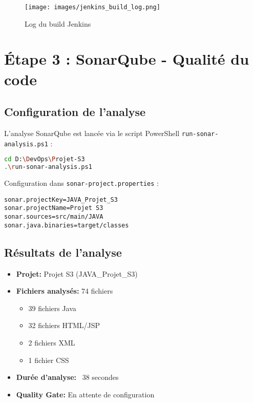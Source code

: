 \documentclass[12pt,a4paper]{article}
\begin{document}
\begin{figure}[H]
    \centering
    \texttt{[image: images/jenkins\_build\_log.png]}
    \caption{Log du build Jenkins}
    \label{fig:jenkins_log}
\end{figure}

\newpage

\section{Étape 3 : SonarQube - Qualité du code}

\subsection{Configuration de l'analyse}

L'analyse SonarQube est lancée via le script PowerShell \texttt{run-sonar-analysis.ps1} :

\begin{lstlisting}[language=bash]
cd D:\DevOps\Projet-S3
.\run-sonar-analysis.ps1
\end{lstlisting}

Configuration dans \texttt{sonar-project.properties} :
\begin{lstlisting}
sonar.projectKey=JAVA_Projet_S3
sonar.projectName=Projet S3
sonar.sources=src/main/JAVA
sonar.java.binaries=target/classes
\end{lstlisting}

\subsection{Résultats de l'analyse}

\begin{tcolorbox}[colback=blue!5!white,colframe=blue!75!black,title=Métriques SonarQube]
    \begin{itemize}
        \item \textbf{Projet:} Projet S3 (JAVA\_Projet\_S3)
        \item \textbf{Fichiers analysés:} 74 fichiers
        \begin{itemize}
            \item 39 fichiers Java
            \item 32 fichiers HTML/JSP
            \item 2 fichiers XML
            \item 1 fichier CSS
        \end{itemize}
        \item \textbf{Durée d'analyse:} ~38 secondes
        \item \textbf{Quality Gate:} En attente de configuration
    \end{itemize}
\end{tcolorbox}
\end{document}
